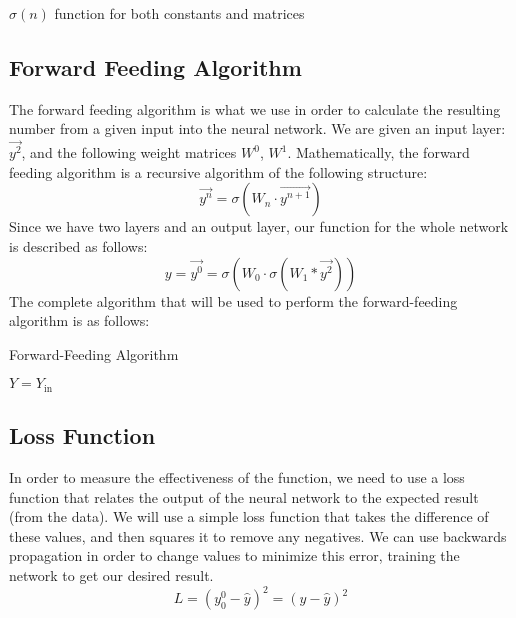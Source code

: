 \documentclass[10pt]{article}
\begin{document}
\begin{algorithm}[H]
    \caption{$\sigma(n)$ function for both constants and matrices}
\end{algorithm}

\subsection{Forward Feeding Algorithm}
The forward feeding algorithm is what we use in order to calculate the resulting number from a given input into the neural network. We are given an input layer: $\vec{y^2}$, and the following weight matrices $W^0$, $W^1$. Mathematically, the forward feeding algorithm is a recursive algorithm of the following structure:
$$\vec{y^n} = \sigma(W_{n} \cdot \vec{y^{n+1}})$$
Since we have two layers and an output layer, our function for the whole network is described as follows:
$$y = \vec{y^0} = \sigma(W_0 \cdot \sigma(W_1 * \vec{y^2}))$$
The complete algorithm that will be used to perform the forward-feeding algorithm is as follows:\\
\begin{algorithm}[H]
    \caption{Forward-Feeding Algorithm}
    $Y = Y_{\text{in}}$\\
\end{algorithm}

\subsection{Loss Function}
In order to measure the effectiveness of the function, we need to use a loss function that relates the output of the neural network to the expected result (from the data). We will use a simple loss function that takes the difference of these values, and then squares it to remove any negatives. We can use backwards propagation in order to change values to minimize this error, training the network to get our desired result.
$$L = (y^0_0 - \hat{y})^2 = (y - \hat{y})^2$$
\end{document}

